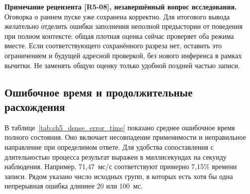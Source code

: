 \ifdefined\AuthorReview
\par\smallskip\begingroup\small\raggedright\color{red!60!black}
\noindent\textbf{Примечание рецензента [R5-08], незавершённый вопрос исследования.} Оговорка о раннем пуске уже сохранена корректно. Для итогового вывода желательно отделить ошибки заполнения неполной предыстории от поведения при полном контексте: общая плотная оценка сейчас проверяет оба режима вместе. Если соответствующего сохранённого разреза нет, оставить это ограничением и будущей адресной проверкой, без нового инференса в рамках вычитки. Не заменять общую оценку только удобной поздней частью записи.\par\endgroup\smallskip
\fi
\ifdefined\AuthorReview
\par{}\smallskip
\fi

\subsection{Ошибочное время и продолжительные расхождения}

В таблице~\ref{tab:ch5_dense_error_time}
показано среднее ошибочное время полного состояния.
Оно включает несовпадение применимости
и неправильное направление при определимом ответе.
Для удобства сопоставления с длительностью процесса
результат выражен в миллисекундах на секунду наблюдения.
Например, 71,47~мс/с соответствуют примерно
7,15\% времени записи.
Рядом указано число исходных групп,
в которых есть хотя бы одна непрерывная ошибка
длиннее 20 или 100~мс.

